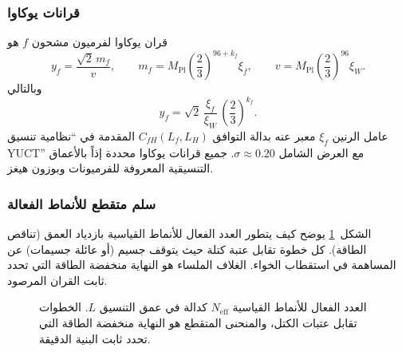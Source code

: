 \documentclass[12pt,a4paper]{article}
\begin{document}
	\subsubsection{قرانات يوكاوا}
	قران يوكاوا لفرميون مشحون \(f\) هو
	\[
	y_f = \frac{\sqrt{2}\,m_f}{v}, \qquad
	m_f = M_{\mathrm{Pl}}\left(\frac{2}{3}\right)^{96+k_f}\xi_f, \qquad
	v   = M_{\mathrm{Pl}}\left(\frac{2}{3}\right)^{96}\xi_W .
	\]
	وبالتالي
	\[
	y_f = \sqrt{2}\,\frac{\xi_f}{\xi_W}\,\left(\frac{2}{3}\right)^{k_f} .
	\]
	عامل الرنين \(\xi_f\) معبر عنه بدالة التوافق \(C_{fH}(L_f,L_H)\) المقدمة في ``نظامية تنسيق YUCT'' مع العرض الشامل \(\sigma \approx 0.20\). جميع قرانات يوكاوا محددة إذاً بالأعماق التنسيقية المعروفة للفرميونات وبوزون هيغز.
	
	\subsubsection{سلم متقطع للأنماط الفعالة}
	الشكل~\ref{fig:ladder} يوضح كيف يتطور العدد الفعال للأنماط القياسية بازدياد العمق (تناقص الطاقة). كل خطوة تقابل عتبة كتلة حيث يتوقف جسيم (أو عائلة جسيمات) عن المساهمة في استقطاب الخواء. الغلاف الملساء هو النهاية منخفضة الطاقة التي تحدد ثابت القران المرصود.
	
	\begin{otherlanguage}{english}
		\begin{figure}[htbp]
			\centering
			\caption{العدد الفعال للأنماط القياسية \(N_{\mathrm{eff}}\) كدالة في عمق التنسيق \(L\). الخطوات تقابل عتبات الكتل، والمنحنى المتقطع هو النهاية منخفضة الطاقة التي تحدد ثابت البنية الدقيقة.}
			\label{fig:ladder}
		\end{figure}
	\end{otherlanguage}
	
\end{document}
